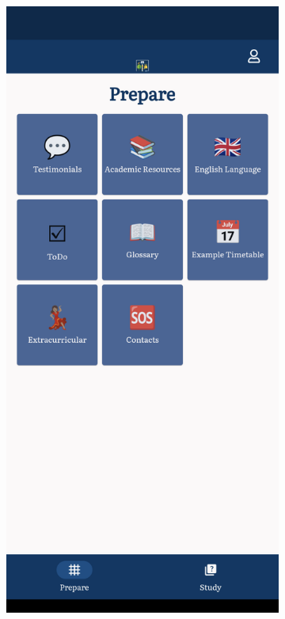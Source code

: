 \documentclass{l4proj}
\begin{document}
\begin{figure}[ht]
    \centering
    \begin{subfigure}[b]{0.25\textwidth}
        \includegraphics[width=\textwidth]{images/prepareBackground1.pdf}

\end{subfigure}
\end{figure}
\end{document}
